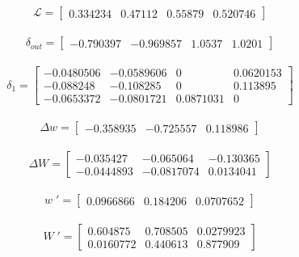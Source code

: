 \documentclass[a4paper]{article}
\begin{document}
\begin{gather}\mathcal{L} = \begin{bmatrix} 0.334234 &	0.47112 &	0.55879 &	0.520746
 \end{bmatrix}\nonumber \end{gather}

\begin{gather}\delta_{out} = \begin{bmatrix} -0.790397 &	-0.969857 &	1.0537 &	1.0201
\end{bmatrix}\nonumber \end{gather}

\begin{gather}\delta_1 = \begin{bmatrix} -0.0480506 & -0.0589606 & 0 &	0.0620153 \\ -0.088248 & -0.108285 &	0 &	0.113895 \\ -0.0653372 & -0.0801721 & 0.0871031 & 0 \end{bmatrix}\nonumber \end{gather}

\begin{gather}\Delta w = \begin{bmatrix} -0.358935 & -0.725557 & 0.118986 \end{bmatrix}\nonumber \end{gather}

\begin{gather}
\Delta W =
\begin{bmatrix} -0.035427 & -0.065064 & -0.130365 \\ -0.0444893 & -0.0817074 & 0.0134041 \end{bmatrix}
\nonumber \end{gather}

\begin{gather} w\;' = \begin{bmatrix} 0.0966866 & 0.184206 & 0.0707652 \end{bmatrix}\nonumber \end{gather}

\begin{gather}
W\;' =
\begin{bmatrix} 0.604875 &	0.708505 & 0.0279923 \\ 0.0160772 &	0.440613 & 0.877909 \end{bmatrix}
\nonumber \end{gather}

\end{document}

